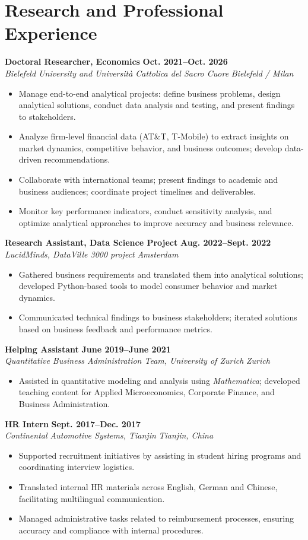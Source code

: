 \documentclass[a4paper,11pt]{article}
\newcommand{\role}[4]{%
  \textbf{#1} \hfill \textbf{#2}\\
  \textit{#3} \hfill \textit{#4}\par
}
\begin{document}
\section{Research and Professional Experience}
\role{Doctoral Researcher, Economics}{Oct. 2021--Oct. 2026}{Bielefeld University and Universit\`a Cattolica del Sacro Cuore}{Bielefeld / Milan}
\begin{itemize}
  \item Manage end-to-end analytical projects: define business problems, design analytical solutions, conduct data analysis and testing, and present findings to stakeholders.
  \item Analyze firm-level financial data (AT\&T, T-Mobile) to extract insights on market dynamics, competitive behavior, and business outcomes; develop data-driven recommendations.
  \item Collaborate with international teams; present findings to academic and business audiences; coordinate project timelines and deliverables.
  \item Monitor key performance indicators, conduct sensitivity analysis, and optimize analytical approaches to improve accuracy and business relevance.
\end{itemize}

\role{Research Assistant, Data Science Project}{Aug. 2022--Sept. 2022}{LucidMinds, DataVille 3000 project}{Amsterdam}
\begin{itemize}
  \item Gathered business requirements and translated them into analytical solutions; developed Python-based tools to model consumer behavior and market dynamics.
  \item Communicated technical findings to business stakeholders; iterated solutions based on business feedback and performance metrics.
\end{itemize}

\role{Helping Assistant}{June 2019--June 2021}{Quantitative Business Administration Team, University of Zurich}{Zurich}
\begin{itemize}
  \item Assisted in quantitative modeling and analysis using \textit{Mathematica}; developed teaching content for Applied Microeconomics, Corporate Finance, and Business Administration.
\end{itemize}

\role{HR Intern}{Sept. 2017--Dec. 2017}{Continental Automotive Systems, Tianjin}{Tianjin, China}
\begin{itemize}
  \item Supported recruitment initiatives by assisting in student hiring programs and coordinating interview logistics.
  \item Translated internal HR materials across English, German and Chinese, facilitating multilingual communication.
  \item Managed administrative tasks related to reimbursement processes, ensuring accuracy and compliance with internal procedures.
\end{itemize}
\end{document}
